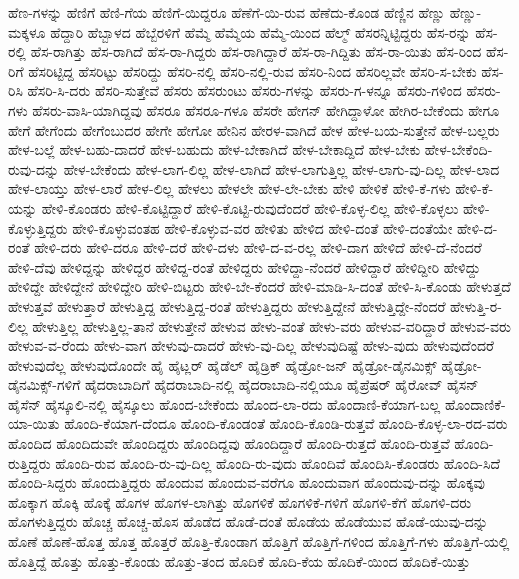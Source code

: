 {ಹೆಣ-ಗಳನ್ನು
ಹೆಣಿಗೆ
ಹೆಣಿ-ಗೆಯ
ಹೆಣಿಗೆ-ಯಿದ್ದರೂ
ಹೆಣೆಗೆ-ಯಿ-ರುವ
ಹೆಣೆದು-ಕೊಂಡ
ಹೆಣ್ಣಿನ
ಹೆಣ್ಣು
ಹೆಣ್ಣು-ಮಕ್ಕಳೂ
ಹೆದ್ದಾರಿ
ಹೆಬ್ಬಾಳದ
ಹೆಬ್ಬೆರಳಿಗೆ
ಹೆಮ್ಮೆ
ಹೆಮ್ಮೆಯ
ಹೆಮ್ಮೆ-ಯಿಂದ
ಹೆಲ್ಮ್
ಹೆಸರನ್ನಿಟ್ಟಿದ್ದರು
ಹೆಸ-ರನ್ನು
ಹೆಸ-ರಲ್ಲಿ
ಹೆಸ-ರಾಗಿತ್ತು
ಹೆಸ-ರಾಗಿದೆ
ಹೆಸ-ರಾ-ಗಿದ್ದರು
ಹೆಸ-ರಾಗಿದ್ದಾರೆ
ಹೆಸ-ರಾ-ಗಿದ್ದಿತು
ಹೆಸ-ರಾ-ಯಿತು
ಹೆಸ-ರಿಂದ
ಹೆಸ-ರಿಗೆ
ಹೆಸರಿಟ್ಟಿದ್ದ
ಹೆಸರಿಟ್ಟು
ಹೆಸರಿದ್ದು
ಹೆಸರಿ-ನಲ್ಲಿ
ಹೆಸರಿ-ನಲ್ಲಿ-ರುವ
ಹೆಸರಿ-ನಿಂದ
ಹೆಸರಿಲ್ಲವೇ
ಹೆಸರಿ-ಸ-ಬೇಕು
ಹೆಸ-ರಿಸಿ
ಹೆಸರಿ-ಸಿ-ದರು
ಹೆಸರಿ-ಸುತ್ತೇವೆ
ಹೆಸರು
ಹೆಸರುಂಟು
ಹೆಸರು-ಗಳನ್ನು
ಹೆಸರು-ಗ-ಳನ್ನೂ
ಹೆಸರು-ಗಳಿಂದ
ಹೆಸರು-ಗಳು
ಹೆಸರು-ವಾಸಿ-ಯಾಗಿದ್ದವು
ಹೆಸರೂ
ಹೆಸರೂ-ಗಳೂ
ಹೆಸರೇ
ಹೇಗನ್
ಹೇಗಿದ್ದಾಳೋ
ಹೇಗಿರ-ಬೇಕೆಂದು
ಹೇಗೂ
ಹೇಗೆ
ಹೇಗೆಂದು
ಹೇಗೆಂಬುದರ
ಹೇಗೇ
ಹೇಗೋ
ಹೇನಿನ
ಹೇರಳ-ವಾಗಿದೆ
ಹೇಳ
ಹೇಳ-ಬಯ-ಸುತ್ತೇನೆ
ಹೇಳ-ಬಲ್ಲರು
ಹೇಳ-ಬಲ್ಲೆ
ಹೇಳ-ಬಹು-ದಾದರೆ
ಹೇಳ-ಬಹುದು
ಹೇಳ-ಬೇಕಾಗಿದೆ
ಹೇಳ-ಬೇಕಾದ್ದಿದೆ
ಹೇಳ-ಬೇಕು
ಹೇಳ-ಬೇಕೆಂದಿ-ರುವು-ದನ್ನು
ಹೇಳ-ಬೇಕೆಂದು
ಹೇಳ-ಲಾಗ-ಲಿಲ್ಲ
ಹೇಳ-ಲಾಗಿದೆ
ಹೇಳ-ಲಾಗುತ್ತಿಲ್ಲ
ಹೇಳ-ಲಾಗು-ವು-ದಿಲ್ಲ
ಹೇಳ-ಲಾದ
ಹೇಳ-ಲಾಯ್ತು
ಹೇಳ-ಲಾರೆ
ಹೇಳ-ಲಿಲ್ಲ
ಹೇಳಲು
ಹೇಳಲೇ
ಹೇಳ-ಲೇ-ಬೇಕು
ಹೇಳಿ
ಹೇಳಿಕೆ
ಹೇಳಿ-ಕೆ-ಗಳು
ಹೇಳಿ-ಕೆ-ಯನ್ನು
ಹೇಳಿ-ಕೊಂಡರು
ಹೇಳಿ-ಕೊಟ್ಟಿದ್ದಾರೆ
ಹೇಳಿ-ಕೊಟ್ಟಿ-ರುವುದೆಂದರೆ
ಹೇಳಿ-ಕೊಳ್ಳ-ಲಿಲ್ಲ
ಹೇಳಿ-ಕೊಳ್ಳಲು
ಹೇಳಿ-ಕೊಳ್ಳುತ್ತಿದ್ದರು
ಹೇಳಿ-ಕೊಳ್ಳುವಂತಹ
ಹೇಳಿ-ಕೊಳ್ಳುವ-ವರ
ಹೇಳಿತು
ಹೇಳಿದ
ಹೇಳಿ-ದಂತೆ
ಹೇಳಿ-ದಂತೆಯೇ
ಹೇಳಿ-ದ-ರಂತೆ
ಹೇಳಿ-ದರು
ಹೇಳಿ-ದರೂ
ಹೇಳಿ-ದರೆ
ಹೇಳಿ-ದಳು
ಹೇಳಿ-ದ-ವ-ರಲ್ಲ
ಹೇಳಿ-ದಾಗ
ಹೇಳಿದೆ
ಹೇಳಿ-ದೆ-ನೆಂದರೆ
ಹೇಳಿ-ದೆವು
ಹೇಳಿದ್ದನ್ನು
ಹೇಳಿದ್ದರ
ಹೇಳಿದ್ದ-ರಂತೆ
ಹೇಳಿದ್ದರು
ಹೇಳಿದ್ದಾ-ನೆಂದರೆ
ಹೇಳಿದ್ದಾರೆ
ಹೇಳಿದ್ದೀರಿ
ಹೇಳಿದ್ದು
ಹೇಳಿದ್ದೇ
ಹೇಳಿದ್ದೇನೆ
ಹೇಳಿದ್ದೇರಿ
ಹೇಳಿ-ಬಿಟ್ಟರು
ಹೇಳಿ-ಬೇ-ಕೆಂದರೆ
ಹೇಳಿ-ಮಾಡಿ-ಸಿ-ದಂತೆ
ಹೇಳಿ-ಸಿ-ಕೊಂಡು
ಹೇಳುತ್ತದೆ
ಹೇಳುತ್ತವೆ
ಹೇಳುತ್ತಾರೆ
ಹೇಳುತ್ತಿದ್ದ
ಹೇಳುತ್ತಿದ್ದ-ರಂತೆ
ಹೇಳುತ್ತಿದ್ದರು
ಹೇಳುತ್ತಿದ್ದೇನೆ
ಹೇಳುತ್ತಿದ್ದೇ-ನೆಂದರೆ
ಹೇಳುತ್ತಿ-ರ-ಲಿಲ್ಲ
ಹೇಳುತ್ತಿಲ್ಲ
ಹೇಳುತ್ತಿಲ್ಲ-ತಾನೆ
ಹೇಳುತ್ತೇನೆ
ಹೇಳುವ
ಹೇಳು-ವಂತೆ
ಹೇಳು-ವರು
ಹೇಳುವ-ವರಿದ್ದಾರೆ
ಹೇಳುವ-ವರು
ಹೇಳುವ-ವ-ರೆಂದು
ಹೇಳು-ವಾಗ
ಹೇಳುವು-ದಾದರೆ
ಹೇಳು-ವು-ದಿಲ್ಲ
ಹೇಳುವುದಿಷ್ಟೆ
ಹೇಳು-ವುದು
ಹೇಳುವುದೆಂದರೆ
ಹೇಳುವುದೆಲ್ಲ
ಹೇಳುವುದೊಂದೇ
ಹೈ
ಹೈಟ್ಲರ್
ಹೈಡೆಲ್
ಹೈಡ್ರಿಕ್
ಹೈಡ್ರೋ-ಜನ್
ಹೈಡ್ರೋ-ಡೈನಮಿಕ್ಸ್
ಹೈಡ್ರೋ-ಡೈನಮಿಕ್ಸ್-ಗಳಿಗೆ
ಹೈದರಾಬಾದಿಗೆ
ಹೈದರಾಬಾದಿ-ನಲ್ಲಿ
ಹೈದರಾಬಾದಿ-ನಲ್ಲಿಯೂ
ಹೈಪ್ರೆಷರ್
ಹೈರೋವ್
ಹೈಸನ್
ಹೈಸೆನ್
ಹೈಸ್ಕೂಲಿ-ನಲ್ಲಿ
ಹೈಸ್ಕೂಲು
ಹೊಂದ-ಬೇಕೆಂದು
ಹೊಂದ-ಲಾ-ರದು
ಹೊಂದಾಣಿ-ಕೆಯಾಗ-ಬಲ್ಲ
ಹೊಂದಾಣಿಕೆ-ಯಾ-ಯಿತು
ಹೊಂದಿ-ಕೆಯಾಗ-ದೆಂದೂ
ಹೊಂದಿ-ಕೊಂಡಂತೆ
ಹೊಂದಿ-ಕೊಂಡಿ-ರುತ್ತವೆ
ಹೊಂದಿ-ಕೊಳ್ಳ-ಲಾ-ರದ-ವರು
ಹೊಂದಿದ
ಹೊಂದಿದುವೇ
ಹೊಂದಿದ್ದರು
ಹೊಂದಿದ್ದವು
ಹೊಂದಿದ್ದಾರೆ
ಹೊಂದಿ-ರುತ್ತದೆ
ಹೊಂದಿ-ರುತ್ತವೆ
ಹೊಂದಿ-ರುತ್ತಿದ್ದರು
ಹೊಂದಿ-ರುವ
ಹೊಂದಿ-ರು-ವು-ದಿಲ್ಲ
ಹೊಂದಿ-ರು-ವುದು
ಹೊಂದಿವೆ
ಹೊಂದಿಸಿ-ಕೊಂಡರು
ಹೊಂದಿ-ಸಿದೆ
ಹೊಂದಿ-ಸಿದ್ದರು
ಹೊಂದುತ್ತಿದ್ದರು
ಹೊಂದುವ
ಹೊಂದುವ-ವರೆಗೂ
ಹೊಂದುವಾಗ
ಹೊಂದುವು-ದನ್ನು
ಹೊಕ್ಕವು
ಹೊಕ್ಕಾಗ
ಹೊಕ್ಕಿ
ಹೊಕ್ಕೆ
ಹೊಗಳ
ಹೊಗಳ-ಲಾಗಿತ್ತು
ಹೊಗಳಿಕೆ
ಹೊಗಳಿಕೆ-ಗಳಿಗೆ
ಹೊಗಳಿ-ಕೆಗೆ
ಹೊಗಳಿ-ದರು
ಹೊಗಳುತ್ತಿದ್ದರು
ಹೊಚ್ಚ
ಹೊಚ್ಚ-ಹೊಸ
ಹೊಡೆದ
ಹೊಡೆ-ದಂತೆ
ಹೊಡೆಯ
ಹೊಡೆಯುವ
ಹೊಡೆ-ಯುವು-ದನ್ನು
ಹೊಣೆ
ಹೊಣೆ-ಹೊತ್ತ
ಹೊತ್ತ
ಹೊತ್ತರೆ
ಹೊತ್ತಿ-ಕೊಂಡಾಗ
ಹೊತ್ತಿಗೆ
ಹೊತ್ತಿಗೆ-ಗಳಿಂದ
ಹೊತ್ತಿಗೆ-ಗಳು
ಹೊತ್ತಿಗೆ-ಯಲ್ಲಿ
ಹೊತ್ತಿದ್ದೆ
ಹೊತ್ತು
ಹೊತ್ತು-ಕೊಂಡು
ಹೊತ್ತು-ತಂದ
ಹೊದಿಕೆ
ಹೊದಿ-ಕೆಯ
ಹೊದಿಕೆ-ಯಿಂದ
ಹೊದಿಕೆ-ಯಿತ್ತು
}
